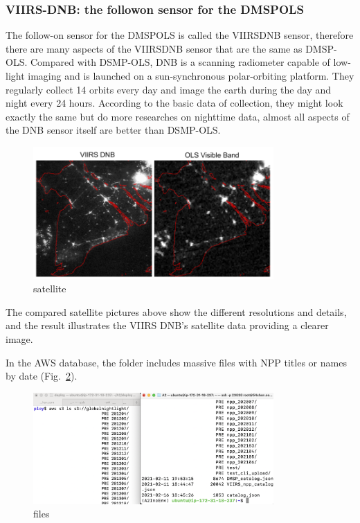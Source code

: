 \documentclass[conference]{IEEEtran}
\begin{document}
\subsubsection{VIIRS-DNB: the follow\-on sensor for the DMSP\-OLS}

The follow-on sensor for the DMSP\-OLS is called the VIIRS\-DNB sensor, therefore there are many aspects of the VIIRS\-DNB sensor that 
are the same as DMSP-OLS. Compared with DSMP-OLS, DNB is a scanning radiometer capable of low-light imaging and is launched on a sun-synchronous 
polar-orbiting platform. They regularly collect 14 orbits every day and image the earth during the day and night every 24 hours. According to 
the basic data of collection, they might look exactly the same but do more researches on nighttime data, almost all aspects of the DNB sensor 
itself are better than DSMP-OLS.

\begin{figure}[htbp]
\centerline{\includegraphics[width=260pt]{images/3.png}}
\caption{satellite}
\label{satellite1}
\end{figure}

The compared satellite pictures above show the different resolutions and details, and the result illustrates the VIIRS DNB's satellite 
data providing a clearer image.

In the AWS database, the folder includes massive files with NPP titles or names by date (Fig.~\ref{satellite2}). 

\begin{figure}[htbp]
    \centerline{\includegraphics[width=260pt]{images/3.1.png}}
    \caption{files}
    \label{satellite2}
\end{figure}
\end{document}
